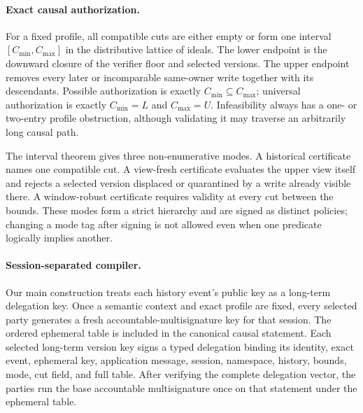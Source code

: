 \documentclass[11pt]{article}
\theoremstyle{definition}
\begin{document}
\paragraph{Exact causal authorization.}
For a fixed profile, all compatible cuts are either empty or form one interval $[C_{\min},C_{\max}]$ in the distributive lattice of ideals.  The lower endpoint is the downward closure of the verifier floor and selected versions.  The upper endpoint removes every later or incomparable same-owner write together with its descendants.  Possible authorization is exactly $C_{\min}\subseteq C_{\max}$; universal authorization is exactly $C_{\min}=L$ and $C_{\max}=U$.  Infeasibility always has a one- or two-entry profile obstruction, although validating it may traverse an arbitrarily long causal path.

The interval theorem gives three non-enumerative modes.  A historical certificate names one compatible cut.  A view-fresh certificate evaluates the upper view itself and rejects a selected version displaced or quarantined by a write already visible there.  A window-robust certificate requires validity at every cut between the bounds.  These modes form a strict hierarchy and are signed as distinct policies; changing a mode tag after signing is not allowed even when one predicate logically implies another.

\paragraph{Session-separated compiler.}
Our main construction treats each history event's public key as a long-term delegation key.  Once a semantic context and exact profile are fixed, every selected party generates a fresh accountable-multisignature key for that session.  The ordered ephemeral table is included in the canonical causal statement.  Each selected long-term version key signs a typed delegation binding its identity, exact event, ephemeral key, application message, session, namespace, history, bounds, mode, cut field, and full table.  After verifying the complete delegation vector, the parties run the base accountable multisignature once on that statement under the ephemeral table.
\end{document}
